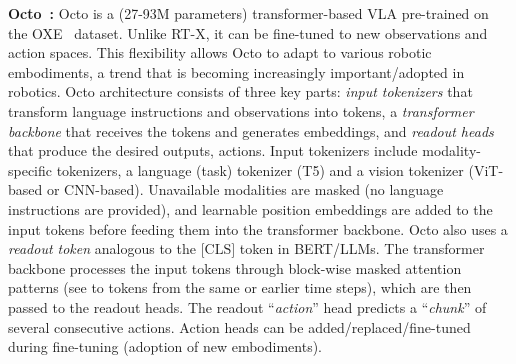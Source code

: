 \noindent\textbf{ Octo~\cite{team2024octo}:} Octo is a (27-93M parameters) transformer-based VLA pre-trained on the OXE~\cite{9} dataset. Unlike RT-X, it can be fine-tuned to new observations and action spaces. This flexibility allows Octo to adapt to various robotic embodiments, a trend that is becoming increasingly important/adopted in robotics.
Octo architecture consists of three key parts: \textit{input tokenizers} that transform language instructions and observations into tokens, a \textit{transformer backbone} that receives the tokens and generates embeddings, and \textit{readout heads} that produce the desired outputs, \ie actions. Input tokenizers include modality-specific tokenizers, \ie a language (task) tokenizer (\eg T5) and a vision tokenizer (\eg ViT-based or CNN-based). Unavailable modalities are masked (\eg no language instructions are provided), and learnable position embeddings are added to the input tokens before feeding them into the transformer backbone.  Octo also uses a \textit{readout token} analogous to the $\text{[CLS]}$ token in BERT/LLMs.
The transformer backbone processes the input tokens through block-wise masked attention patterns (\ie see to tokens from the same or earlier time steps), which are then passed to the readout heads. The readout ``\textit{action}'' head predicts a ``\textit{chunk}'' of several consecutive actions.
Action heads can be added/replaced/fine-tuned during fine-tuning (\eg adoption of new embodiments).
